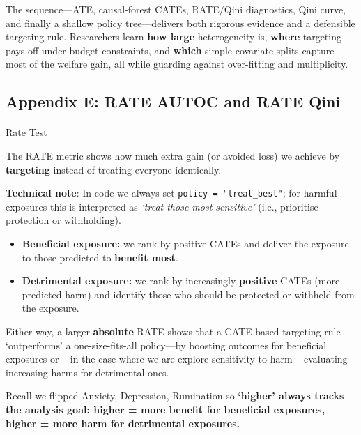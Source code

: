 \documentclass[
  single column]{article}
\makeatletter
\let\oldparagraph\paragraph
\renewcommand{\paragraph}{
    \@ifstar
      \xxxParagraphStar
      \xxxParagraphNoStar
  }
\newcommand{\xxxParagraphStar}[1]{\oldparagraph*{#1}\mbox{}}
\newcommand{\xxxParagraphNoStar}[1]{\oldparagraph{#1}\mbox{}}
\providecommand{\tightlist}{%
  \setlength{\itemsep}{0pt}\setlength{\parskip}{0pt}}
\makeatother
\begin{document}
The sequence---ATE, causal-forest CATEs, RATE/Qini diagnostics, Qini
curve, and finally a shallow policy tree---delivers both rigorous
evidence and a defensible targeting rule. Researchers learn \textbf{how
large} heterogeneity is, \textbf{where} targeting pays off under budget
constraints, and \textbf{which} simple covariate splits capture most of
the welfare gain, all while guarding against over-fitting and
multiplicity.

\newpage{}

\newpage{}

\subsection{Appendix E: RATE AUTOC and RATE Qini}\label{appendix-rate}

\paragraph{Rate Test}\label{rate-test}

The RATE metric shows how much extra gain (or avoided loss) we achieve
by \textbf{targeting} instead of treating everyone identically.

\textbf{Technical note}: In code we always set
\texttt{policy\ =\ "treat\_best"}; for harmful exposures this is
interpreted as \emph{`treat-those-most-sensitive'} (i.e., prioritise
protection or withholding).

\begin{itemize}
\tightlist
\item
  \textbf{Beneficial exposure:} we rank by positive CATEs and deliver
  the exposure to those predicted to \textbf{benefit most}.
\item
  \textbf{Detrimental exposure:} we rank by increasingly
  \textbf{positive} CATEs (more predicted harm) and identify those who
  should be protected or withheld from the exposure.
\end{itemize}

Either way, a larger \textbf{absolute} RATE shows that a CATE-based
targeting rule `outperforms' a one-size-fits-all policy---by boosting
outcomes for beneficial exposures or -- in the case where we are explore
sensitivity to harm -- evaluating increasing harms for detrimental ones.

Recall we flipped Anxiety, Depression, Rumination so \textbf{`higher'
always tracks the analysis goal: higher = more benefit for beneficial
exposures, higher = more harm for detrimental exposures.}
\end{document}
